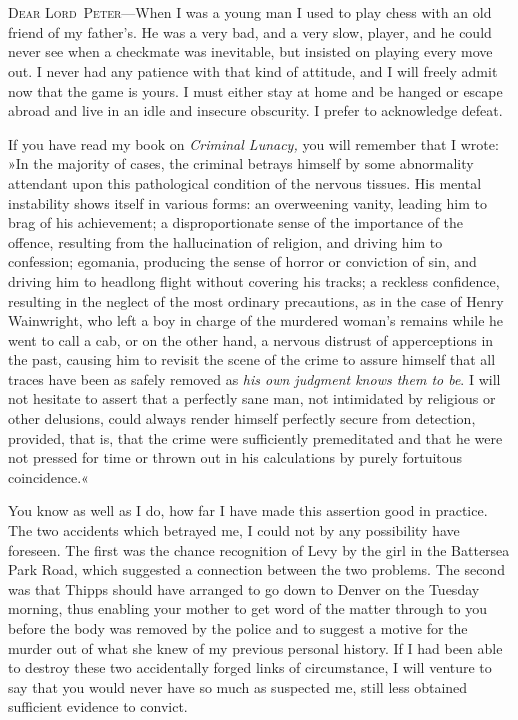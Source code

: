 \chapter[Chapter \thechapter]{}
\lettrine[lines=4]{D}{ear} \textsc{Lord~Peter}—When I was a young man I used to play chess with an old friend of my father's. He was a very bad, and a very slow, player, and he could never see when a checkmate was inevitable, but insisted on playing every move out. I never had any patience with that kind of attitude, and I will freely admit now that the game is yours. I must either stay at home and be hanged or escape abroad and live in an idle and insecure obscurity. I prefer to acknowledge defeat.

If you have read my book on \textit{Criminal Lunacy,} you will remember that I wrote: »In the majority of cases, the criminal betrays himself by some abnormality attendant upon this pathological condition of the nervous tissues. His mental instability shows itself in various forms: an overweening vanity, leading him to brag of his achievement; a disproportionate sense of the importance of the offence, resulting from the hallucination of religion, and driving him to confession; egomania, producing the sense of horror or conviction of sin, and driving him to headlong flight without covering his tracks; a reckless confidence, resulting in the neglect of the most ordinary precautions, as in the case of Henry Wainwright, who left a boy in charge of the murdered woman's remains while he went to call a cab, or on the other hand, a nervous distrust of apperceptions in the past, causing him to revisit the scene of the crime to assure himself that all traces have been as safely removed as \textit{his own judgment knows them to be}. I will not hesitate to assert that a perfectly sane man, not intimidated by religious or other delusions, could always render himself perfectly secure from detection, provided, that is, that the crime were sufficiently premeditated and that he were not pressed for time or thrown out in his calculations by purely fortuitous coincidence.«

You know as well as I do, how far I have made this assertion good in practice. The two accidents which betrayed me, I could not by any possibility have foreseen. The first was the chance recognition of Levy by the girl in the Battersea Park Road, which suggested a connection between the two problems. The second was that Thipps should have arranged to go down to Denver on the Tuesday morning, thus enabling your mother to get word of the matter through to you before the body was removed by the police and to suggest a motive for the murder out of what she knew of my previous personal history. If I had been able to destroy these two accidentally forged links of circumstance, I will venture to say that you would never have so much as suspected me, still less obtained sufficient evidence to convict.

